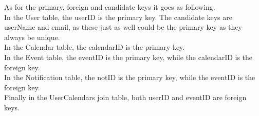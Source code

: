 As for the primary, foreign and candidate keys it goes as following.\\
In the User table, the userID is the primary key. The candidate keys are userName and email, as these just as well could be the primary key as they always be unique.\\
In the Calendar table, the calendarID is the primary key.\\
In the Event table, the eventID is the primary key, while the calendarID is the foreign key.\\
In the Notification table,  the notID is the primary key, while the eventID is the foreign key.\\
Finally in the UserCalendars join table, both userID and eventID are foreign keys.\\